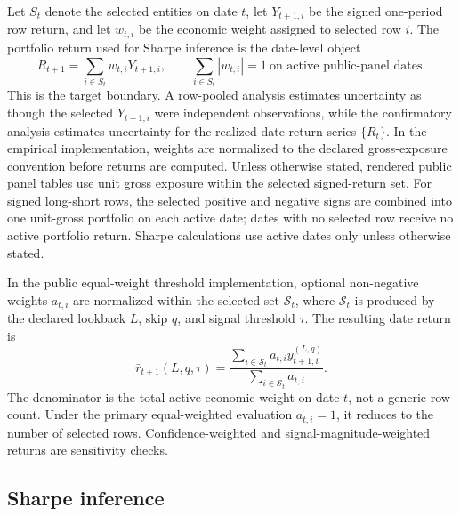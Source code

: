 \documentclass[12pt,a4paper]{article}
\begin{document}
Let \(S_t\) denote the selected entities on date \(t\), let \(Y_{t+1,i}\)
be the signed one-period row return, and let \(w_{t,i}\) be the economic
weight assigned to selected row \(i\).  The portfolio return used for
Sharpe inference is the date-level object
\begin{equation}
  R_{t+1}=\sum_{i\in S_t} w_{t,i}Y_{t+1,i},
  \qquad \sum_{i\in S_t}|w_{t,i}|=1
  \ \text{on active public-panel dates}.
  \label{eq:date-target}
\end{equation}
This is the target boundary.  A row-pooled analysis estimates uncertainty
as though the selected \(Y_{t+1,i}\) were independent observations, while
the confirmatory analysis estimates uncertainty for the realized
date-return series \(\{R_t\}\).  In the empirical implementation,
weights are normalized to the declared gross-exposure convention before
returns are computed.  Unless otherwise stated, rendered public panel
tables use unit gross exposure within the selected signed-return set.
For signed long-short rows, the selected positive and negative signs are
combined into one unit-gross portfolio on each active date; dates with no
selected row receive no active portfolio return.  Sharpe calculations use
active dates only unless otherwise stated.

In the public equal-weight threshold implementation, optional
non-negative weights \(a_{t,i}\) are normalized within the selected set
\(\mathcal S_t\), where \(\mathcal S_t\) is produced by the declared
lookback \(L\), skip \(q\), and signal threshold \(\tau\).  The resulting
date return is
\begin{equation}
  \bar r_{t+1}(L,q,\tau) =
  \frac{\sum_{i\in\mathcal S_t} a_{t,i}y_{t+1,i}^{(L,q)}}
       {\sum_{i\in\mathcal S_t} a_{t,i}} .
  \label{eq:date-return}
\end{equation}
The denominator is the total active economic weight on date \(t\), not a
generic row count.  Under the primary equal-weighted evaluation
\(a_{t,i}=1\), it reduces to the number of selected rows.  Confidence-weighted
and signal-magnitude-weighted returns are sensitivity checks.

\subsection{Sharpe inference}
\end{document}
